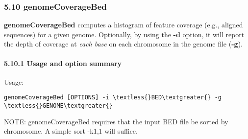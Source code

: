 \documentclass[letterpaper,10pt,english]{sphinxmanual}
\begin{document}
\subsubsection{5.10 genomeCoverageBed}
\label{content/genomecoverageBed:genomecoveragebed}\label{content/genomecoverageBed::doc}
\textbf{genomeCoverageBed} computes a histogram of feature coverage (e.g., aligned sequences) for a given
genome. Optionally, by using the \textbf{-d} option, it will report the depth of coverage at \emph{each base} on each
chromosome in the genome file (\textbf{-g}).


\paragraph{5.10.1 Usage and option summary}
\label{content/genomecoverageBed:usage-and-option-summary}
Usage:

\begin{Verbatim}[commandchars=\\\{\}]
genomeCoverageBed [OPTIONS] -i \textless{}BED\textgreater{} -g \textless{}GENOME\textgreater{}
\end{Verbatim}

NOTE: genomeCoverageBed requires that the input BED file be sorted by
chromosome. A simple sort -k1,1 will suffice.
\end{document}
